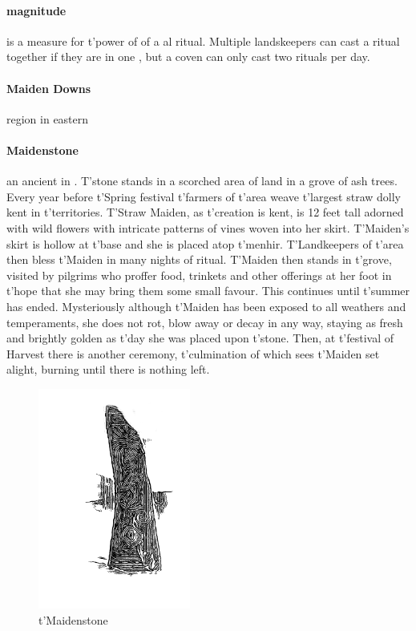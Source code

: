 \paragraph{magnitude} is a measure for t'\allowbreak power of of a al ritual. Multiple landskeepers can cast a ritual together if they are in one , but a coven can only cast two rituals per day.
\paragraph{Maiden Downs} region in eastern 
\paragraph{Maidenstone} an ancient  in . T'stone stands in a scorched area of land in a grove of ash trees. Every year before t'\allowbreak Spring festival t'\allowbreak farmers of t'\allowbreak area weave t'\allowbreak largest straw dolly kent in t'\allowbreak territories. T'Straw Maiden, as t'\allowbreak creation is kent, is 12 feet tall adorned with wild flowers with intricate patterns of vines woven into her skirt. T'Maiden’s skirt is hollow at t'\allowbreak base and she is placed atop t'\allowbreak menhir. T'Landkeepers of t'\allowbreak area then bless t'\allowbreak Maiden in many nights of ritual. T'Maiden then stands in t'\allowbreak grove, visited by pilgrims who proffer food, trinkets and other offerings at her foot in t'\allowbreak hope that she may bring them some small favour. This continues until t'\allowbreak summer has ended. Mysteriously although t'\allowbreak Maiden has been exposed to all weathers and temperaments, she does not rot, blow away or decay in any way, staying as fresh and brightly golden as t'\allowbreak day she was placed upon t'\allowbreak stone. Then, at t'\allowbreak festival of Harvest there is another ceremony, t'\allowbreak culmination of which sees t'\allowbreak Maiden set alight, burning until there is nothing left. \begin{figure} \centering \includegraphics[width=5cm]{encyclopedia/Maidenstone} \caption{t'Maidenstone}\end{figure}
